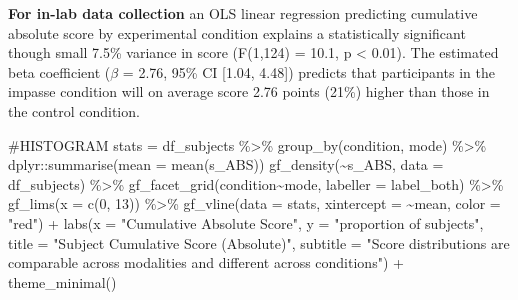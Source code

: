 \documentclass[
  letterpaper,
  DIV=11,
  numbers=noendperiod]{scrreprt}
\newenvironment{Shaded}{\begin{snugshade}}{\end{snugshade}}
\newcommand{\AttributeTok}[1]{\textcolor[rgb]{0.40,0.45,0.13}{#1}}
\newcommand{\CommentTok}[1]{\textcolor[rgb]{0.37,0.37,0.37}{#1}}
\newcommand{\DecValTok}[1]{\textcolor[rgb]{0.68,0.00,0.00}{#1}}
\newcommand{\FunctionTok}[1]{\textcolor[rgb]{0.28,0.35,0.67}{#1}}
\newcommand{\NormalTok}[1]{\textcolor[rgb]{0.00,0.23,0.31}{#1}}
\newcommand{\OtherTok}[1]{\textcolor[rgb]{0.00,0.23,0.31}{#1}}
\newcommand{\SpecialCharTok}[1]{\textcolor[rgb]{0.37,0.37,0.37}{#1}}
\newcommand{\StringTok}[1]{\textcolor[rgb]{0.13,0.47,0.30}{#1}}
\begin{document}
\textbf{For in-lab data collection} an OLS linear regression predicting
cumulative absolute score by experimental condition explains a
statistically significant though small 7.5\% variance in score (F(1,124)
= 10.1, p \textless{} 0.01). The estimated beta coefficient (\(\beta\) =
2.76, 95\% CI {[}1.04, 4.48{]}) predicts that participants in the
impasse condition will on average score 2.76 points (21\%) higher than
those in the control condition.

\begin{Shaded}
\begin{Highlighting}[]
\CommentTok{\#HISTOGRAM}
\NormalTok{stats }\OtherTok{=}\NormalTok{ df\_subjects }\SpecialCharTok{\%\textgreater{}\%} \FunctionTok{group\_by}\NormalTok{(condition, mode) }\SpecialCharTok{\%\textgreater{}\%}\NormalTok{ dplyr}\SpecialCharTok{::}\FunctionTok{summarise}\NormalTok{(}\AttributeTok{mean =} \FunctionTok{mean}\NormalTok{(s\_ABS))}
\FunctionTok{gf\_density}\NormalTok{(}\SpecialCharTok{\textasciitilde{}}\NormalTok{s\_ABS, }\AttributeTok{data =}\NormalTok{ df\_subjects) }\SpecialCharTok{\%\textgreater{}\%} 
  \FunctionTok{gf\_facet\_grid}\NormalTok{(condition}\SpecialCharTok{\textasciitilde{}}\NormalTok{mode, }\AttributeTok{labeller =}\NormalTok{ label\_both) }\SpecialCharTok{\%\textgreater{}\%} 
  \FunctionTok{gf\_lims}\NormalTok{(}\AttributeTok{x =} \FunctionTok{c}\NormalTok{(}\DecValTok{0}\NormalTok{, }\DecValTok{13}\NormalTok{)) }\SpecialCharTok{\%\textgreater{}\%} 
  \FunctionTok{gf\_vline}\NormalTok{(}\AttributeTok{data =}\NormalTok{ stats, }\AttributeTok{xintercept =} \SpecialCharTok{\textasciitilde{}}\NormalTok{mean, }\AttributeTok{color =} \StringTok{"red"}\NormalTok{) }\SpecialCharTok{+}
  \FunctionTok{labs}\NormalTok{(}\AttributeTok{x =} \StringTok{"Cumulative Absolute Score"}\NormalTok{,}
       \AttributeTok{y =} \StringTok{"proportion of subjects"}\NormalTok{,}
       \AttributeTok{title =} \StringTok{"Subject Cumulative Score (Absolute)"}\NormalTok{,}
       \AttributeTok{subtitle =} \StringTok{"Score distributions are comparable across modalities and different across conditions"}\NormalTok{) }\SpecialCharTok{+} 
  \FunctionTok{theme\_minimal}\NormalTok{()}
\end{Highlighting}
\end{Shaded}
\end{document}
